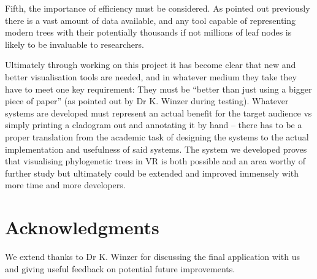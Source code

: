 \documentclass[10pt,letterpaper]{article}
\begin{document}
Fifth, the importance of efficiency must be considered. As pointed out previously there is a vast amount of data available, and any tool capable of representing modern trees with their potentially thousands if not millions of leaf nodes is likely to be invaluable to researchers. 

Ultimately through working on this project it has become clear that new and better visualisation tools are needed, and in whatever medium they take they have to meet one key requirement: They must be “better than just using a bigger piece of paper” (as pointed out by Dr K. Winzer during testing). Whatever systems are developed must represent an actual benefit for the target audience vs simply printing a cladogram out and annotating it by hand – there has to be a proper translation from the academic task of designing the systems to the actual implementation and usefulness of said systems. The system we developed proves that visualising phylogenetic trees in VR is both possible and an area worthy of further study but ultimately could be extended and improved immensely with more time and more developers. 

\section*{Acknowledgments}
We extend thanks to Dr K. Winzer for discussing the final application with us and giving useful feedback on potential future improvements.

\nolinenumbers
\end{document}
